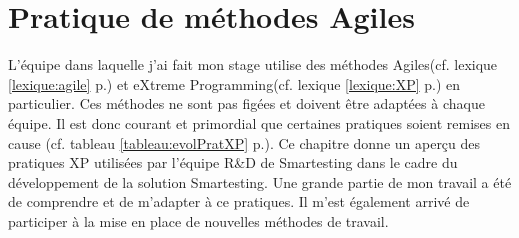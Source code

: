 \chapter{Pratique de méthodes Agiles}\label{agile}
L'équipe dans laquelle j'ai fait mon stage utilise des méthodes Agiles(cf. lexique \ref{lexique:agile} p.\pageref{lexique:agile}) et eXtreme Programming(cf. lexique \ref{lexique:XP} p.\pageref{lexique:XP}) en particulier. Ces méthodes ne sont pas figées et doivent être adaptées à chaque équipe. Il est donc courant et primordial que certaines pratiques soient remises en cause (cf. tableau \ref{tableau:evolPratXP} p.\pageref{tableau:evolPratXP}). Ce chapitre donne un aperçu des pratiques XP utilisées par l'équipe R\&D de Smartesting dans le cadre du développement de la solution Smartesting. Une grande partie de mon travail a été de comprendre et de m'adapter à ce pratiques. Il m'est également arrivé de participer à la mise en place de nouvelles méthodes de travail.
